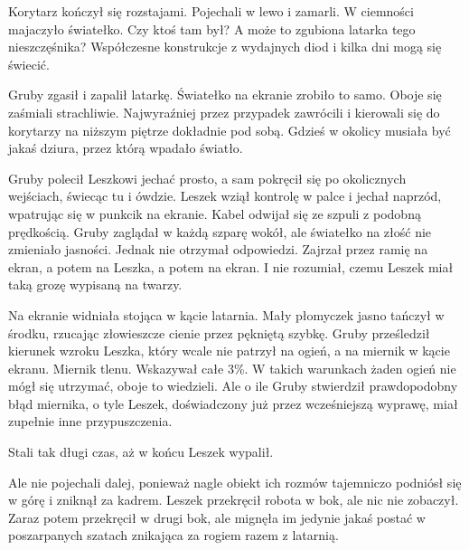Korytarz kończył się rozstajami.
Pojechali w lewo i zamarli.
W ciemności majaczyło światełko.
Czy ktoś tam był? A może to zgubiona latarka tego nieszczęśnika?
Współczesne konstrukcje z wydajnych diod i kilka dni mogą się świecić.

Gruby zgasił i zapalił latarkę. Światełko na ekranie zrobiło to samo.
Oboje się zaśmiali strachliwie. Najwyraźniej przez przypadek zawrócili i kierowali się do korytarzy na niższym piętrze dokładnie pod sobą.
Gdzieś w okolicy musiała być jakaś dziura, przez którą wpadało światło.

Gruby polecił Leszkowi jechać prosto, a sam pokręcił się po okolicznych wejściach, świecąc tu i ówdzie.
Leszek wziął kontrolę w palce i jechał naprzód, wpatrując się w punkcik na ekranie.
Kabel odwijał się ze szpuli z podobną prędkością.
Gruby zaglądał w każdą szparę wokół, ale światełko na złość nie zmieniało jasności.
Jednak nie otrzymał odpowiedzi.
Zajrzał przez ramię na ekran, a potem na Leszka, a potem na ekran. I nie rozumiał, czemu Leszek miał taką grozę wypisaną na twarzy.

Na ekranie widniała stojąca w kącie latarnia. Mały płomyczek jasno tańczył w środku, rzucając złowieszcze cienie przez pękniętą szybkę.
Gruby prześledził kierunek wzroku Leszka, który wcale nie patrzył na ogień, a na miernik w kącie ekranu.
Miernik tlenu.
Wskazywał całe 3\%.
W takich warunkach żaden ogień nie mógł się utrzymać, oboje to wiedzieli.
Ale o ile Gruby stwierdził prawdopodobny błąd miernika, o tyle Leszek, doświadczony już przez wcześniejszą wyprawę, miał zupełnie inne przypuszczenia.

Stali tak długi czas, aż w końcu Leszek wypalił.

Ale nie pojechali dalej, ponieważ nagle obiekt ich rozmów tajemniczo podniósł się w górę i zniknął za kadrem.
Leszek przekręcił robota w bok, ale nic nie zobaczył.
Zaraz potem przekręcił w drugi bok, ale mignęła im jedynie jakaś postać w poszarpanych szatach znikająca za rogiem razem z latarnią.

